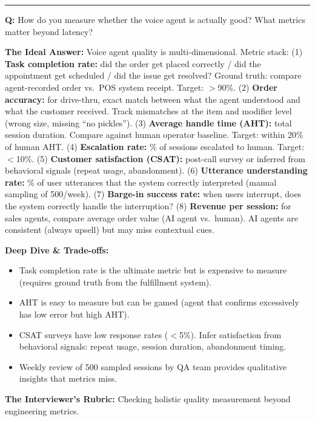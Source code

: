 \bigskip\hrule\bigskip

\textbf{Q:} How do you measure whether the voice agent is actually good? What metrics matter beyond latency?

\textbf{The Ideal Answer:} Voice agent quality is multi-dimensional. Metric stack: (1) \textbf{Task completion rate:} did the order get placed correctly / did the appointment get scheduled / did the issue get resolved? Ground truth: compare agent-recorded order vs.\ POS system receipt. Target: $>$90\%. (2) \textbf{Order accuracy:} for drive-thru, exact match between what the agent understood and what the customer received. Track mismatches at the item and modifier level (wrong size, missing ``no pickles''). (3) \textbf{Average handle time (AHT):} total session duration. Compare against human operator baseline. Target: within 20\% of human AHT. (4) \textbf{Escalation rate:} \% of sessions escalated to human. Target: $<$10\%. (5) \textbf{Customer satisfaction (CSAT):} post-call survey or inferred from behavioral signals (repeat usage, abandonment). (6) \textbf{Utterance understanding rate:} \% of user utterances that the system correctly interpreted (manual sampling of 500/week). (7) \textbf{Barge-in success rate:} when users interrupt, does the system correctly handle the interruption? (8) \textbf{Revenue per session:} for sales agents, compare average order value (AI agent vs.\ human). AI agents are consistent (always upsell) but may miss contextual cues.

\textbf{Deep Dive \& Trade-offs:}
\begin{itemize}
  \item Task completion rate is the ultimate metric but is expensive to measure (requires ground truth from the fulfillment system).
  \item AHT is easy to measure but can be gamed (agent that confirms excessively has low error but high AHT).
  \item CSAT surveys have low response rates ($<$5\%). Infer satisfaction from behavioral signals: repeat usage, session duration, abandonment timing.
  \item Weekly review of 500 sampled sessions by QA team provides qualitative insights that metrics miss.
\end{itemize}

\textbf{The Interviewer's Rubric:} Checking holistic quality measurement beyond engineering metrics.

